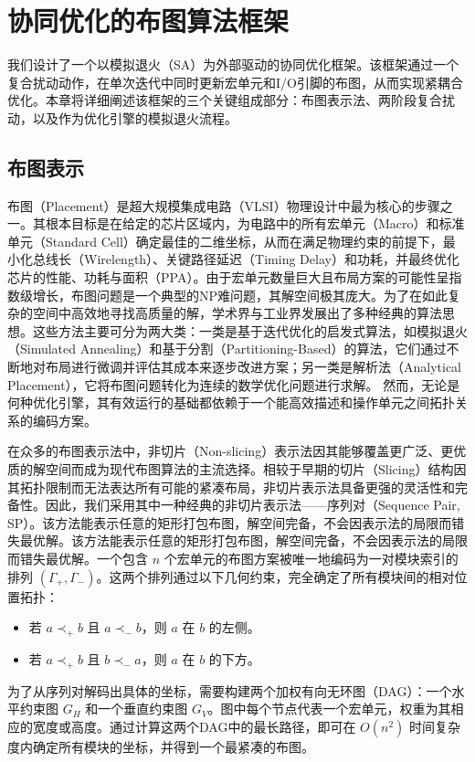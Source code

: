 \documentclass[conference]{IEEEtran}
\begin{document}
\section{协同优化的布图算法框架}
我们设计了一个以模拟退火（SA）为外部驱动的协同优化框架。该框架通过一个复合扰动动作，在单次迭代中同时更新宏单元和I/O引脚的布图，从而实现紧耦合优化。本章将详细阐述该框架的三个关键组成部分：布图表示法、两阶段复合扰动，以及作为优化引擎的模拟退火流程。

\subsection{布图表示}
布图（Placement）是超大规模集成电路（VLSI）物理设计中最为核心的步骤之一。其根本目标是在给定的芯片区域内，为电路中的所有宏单元（Macro）和标准单元（Standard Cell）确定最佳的二维坐标，从而在满足物理约束的前提下，最小化总线长（Wirelength）、关键路径延迟（Timing Delay）和功耗，并最终优化芯片的性能、功耗与面积（PPA）。由于宏单元数量巨大且布局方案的可能性呈指数级增长，布图问题是一个典型的NP难问题，其解空间极其庞大。为了在如此复杂的空间中高效地寻找高质量的解，学术界与工业界发展出了多种经典的算法思想。这些方法主要可分为两大类：一类是基于迭代优化的启发式算法，如模拟退火（Simulated Annealing）和基于分割（Partitioning-Based）的算法，它们通过不断地对布局进行微调并评估其成本来逐步改进方案；另一类是解析法（Analytical Placement），它将布图问题转化为连续的数学优化问题进行求解。
然而，无论是何种优化引擎，其有效运行的基础都依赖于一个能高效描述和操作单元之间拓扑关系的编码方案。

在众多的布图表示法中，非切片（Non-slicing）表示法因其能够覆盖更广泛、更优质的解空间而成为现代布图算法的主流选择。相较于早期的切片（Slicing）结构因其拓扑限制而无法表达所有可能的紧凑布局，非切片表示法具备更强的灵活性和完备性。因此，我们采用其中一种经典的非切片表示法——序列对（Sequence Pair, SP）\cite{H.K.-46}。该方法能表示任意的矩形打包布图，解空间完备，不会因表示法的局限而错失最优解。该方法能表示任意的矩形打包布图，解空间完备，不会因表示法的局限而错失最优解。一个包含 $n$ 个宏单元的布图方案被唯一地编码为一对模块索引的排列 $(\Gamma_+, \Gamma_-)$。这两个排列通过以下几何约束，完全确定了所有模块间的相对位置拓扑：
\begin{itemize}
    \item 若 $a \prec_+ b$ 且 $a \prec_- b$，则 $a$ 在 $b$ 的左侧。
    \item 若 $a \prec_+ b$ 且 $b \prec_- a$，则 $a$ 在 $b$ 的下方。
\end{itemize}
为了从序列对解码出具体的坐标，需要构建两个加权有向无环图（DAG）：一个水平约束图 $G_H$ 和一个垂直约束图 $G_V$。图中每个节点代表一个宏单元，权重为其相应的宽度或高度。通过计算这两个DAG中的最长路径，即可在 $O(n^2)$ 时间复杂度内确定所有模块的坐标，并得到一个最紧凑的布图。
\end{document}
